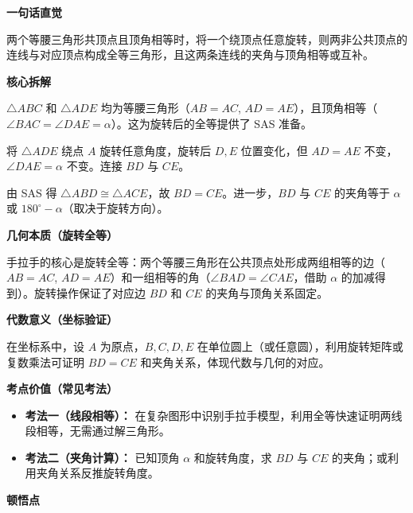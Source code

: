 \begin{explanationbox}

	\textbf{\textcolor{CExplanation}{一句话直觉}}

	两个等腰三角形共顶点且顶角相等时，将一个绕顶点任意旋转，则两非公共顶点的连线与对应顶点构成全等三角形，且这两条连线的夹角与顶角相等或互补。

	\medskip
	\textbf{\textcolor{CExplanation}{核心拆解}}
	\begin{description}[style=nextline, leftmargin=2.8em, labelsep=0.5em, itemsep=0.45em]
		\item[\textbf{要点一（全等条件）：}]
			$\triangle ABC$ 和 $\triangle ADE$ 均为等腰三角形（$AB=AC$, $AD=AE$），且顶角相等（$\angle BAC=\angle DAE=\alpha$）。这为旋转后的全等提供了 SAS 准备。
		\item[\textbf{要点二（旋转构造）：}]
			将 $\triangle ADE$ 绕点 $A$ 旋转任意角度，旋转后 $D,E$ 位置变化，但 $AD=AE$ 不变，$\angle DAE=\alpha$ 不变。连接 $BD$ 与 $CE$。
		\item[\textbf{要点三（全等结论）：}]
			由 SAS 得 $\triangle ABD\cong\triangle ACE$，故 $BD=CE$。进一步，$BD$ 与 $CE$ 的夹角等于 $\alpha$ 或 $180^\circ-\alpha$（取决于旋转方向）。
	\end{description}

	\medskip
	\textbf{\textcolor{CExplanation}{几何本质（旋转全等）}}

	手拉手的核心是旋转全等：两个等腰三角形在公共顶点处形成两组相等的边（$AB=AC$, $AD=AE$）和一组相等的角（$\angle BAD=\angle CAE$，借助 $\alpha$ 的加减得到）。旋转操作保证了对应边 $BD$ 和 $CE$ 的夹角与顶角关系固定。

	\medskip
	\textbf{\textcolor{CExplanation}{代数意义（坐标验证）}}

	在坐标系中，设 $A$ 为原点，$B,C,D,E$ 在单位圆上（或任意圆），利用旋转矩阵或复数乘法可证明 $BD=CE$ 和夹角关系，体现代数与几何的对应。

	\medskip
	\textbf{\textcolor{CExplanation}{考点价值（常见考法）}}
	\begin{itemize}[leftmargin=*, itemsep=0.5em, topsep=0.4em]
		\item \textbf{考法一（线段相等）：} 在复杂图形中识别手拉手模型，利用全等快速证明两线段相等，无需通过解三角形。
		\item \textbf{考法二（夹角计算）：} 已知顶角 $\alpha$ 和旋转角度，求 $BD$ 与 $CE$ 的夹角；或利用夹角关系反推旋转角度。
	\end{itemize}

	\medskip
	\textbf{\textcolor{CExplanation}{顿悟点}}


\end{explanationbox}
